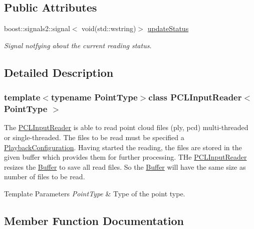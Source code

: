 \subsection*{Public Attributes}
\begin{DoxyCompactItemize}
\item 
\hypertarget{class_p_c_l_input_reader_a26d60f39f151a0deed6ad990d264571f}{}boost\+::signals2\+::signal$<$ void(std\+::wstring)$>$ \hyperlink{class_p_c_l_input_reader_a26d60f39f151a0deed6ad990d264571f}{update\+Status}\label{class_p_c_l_input_reader_a26d60f39f151a0deed6ad990d264571f}

\begin{DoxyCompactList}\small\item\em Signal notfying about the current reading status. \end{DoxyCompactList}\end{DoxyCompactItemize}


\subsection{Detailed Description}
\subsubsection*{template$<$typename Point\+Type$>$class P\+C\+L\+Input\+Reader$<$ Point\+Type $>$}

The \hyperlink{class_p_c_l_input_reader}{P\+C\+L\+Input\+Reader} is able to read point cloud files (ply, pcd) multi-\/threaded or single-\/threaded. The files to be read must be specified a \hyperlink{class_playback_configuration}{Playback\+Configuration}. Having started the reading, the files are stored in the given buffer which provides them for further processing. T\+He \hyperlink{class_p_c_l_input_reader}{P\+C\+L\+Input\+Reader} resizes the \hyperlink{class_buffer}{Buffer} to save all read files. So the \hyperlink{class_buffer}{Buffer} will have the same size as number of files to be read. 


\begin{DoxyTemplParams}{Template Parameters}
{\em Point\+Type} & Type of the point type. \\
\hline
\end{DoxyTemplParams}


\subsection{Member Function Documentation}
\hypertarget{class_p_c_l_input_reader_a7457aaa810319d498c992403707252e6}{}
